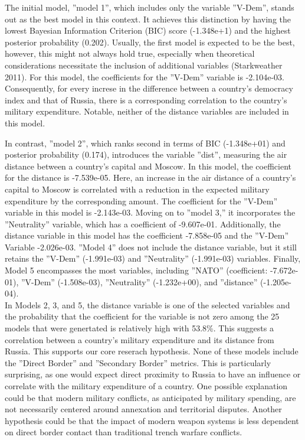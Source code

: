 \documentclass[12pt,a4paper]{article}
\begin{document}
The initial model, ''model 1'', which includes only the variable ''V-Dem'', stands out as the best model in this context. It achieves this distinction by having the lowest Bayesian Information Criterion (BIC) score (-1.348e+1) and the highest posterior probability (0.202). Usually, the first model is expected to be the best, however, this might not always hold true, especially when theoretical considerations necessitate the inclusion of additional variables (Starkweather 2011). For this model, the coefficients for the ''V-Dem'' variable is -2.104e-03. Consequently, for every increse in the difference between a country's democracy index and that of Russia, there is a corresponding correlation to the country's military expenditure. Notable, neither of the distance variables are included in this model. 

In contrast, ''model 2'', which ranks second in terms of BIC (-1.348e+01) and posterior probability (0.174), introduces the variable ''dist'', measuring the air distance between a country's capital and Moscow. In this model, the coefficient for the distance is -7.539e-05. Here, an increase in the air distance of a country's capital to Moscow is correlated with a reduction in the expected military expenditure by the corresponding amount. The coefficient for the ''V-Dem'' variable in this model is -2.143e-03. Moving on to ''model 3,'' it incorporates the ''Neutrality'' variable, which has a coefficient of -9.607e-01. Additionally, the distance variable in this model has the coefficient -7.858e-05 and the ''V-Dem'' Variable -2.026e-03. ''Model 4'' does not include the distance variable, but it still retains the ''V-Dem'' (-1.991e-03) and ''Neutrality'' (-1.991e-03) variables. Finally, Model 5 encompasses the most variables, including ''NATO'' (coefficient: -7.672e-01), ''V-Dem'' (-1.508e-03), ''Neutrality'' (-1.232e+00), and ''distance'' (-1.205e-04).\\

In Models 2, 3, and 5, the distance variable is one of the selected variables and the probability that the coefficient for the variable is not zero among the 25 models that were genertated is relatively high with 53.8\%. This suggests a correlation between a country's military expenditure and its distance from Russia. This supports our core reserach hypothesis. None of these models include the ''Direct Border'' and ''Secondary Border'' metrics. This is particularly surprising, as one would expect direct proximity to Russia to have an influence or correlate with the military expenditure of a country. One possible explanation could be that modern military conflicts, as anticipated by military spending, are not necessarily centered around annexation and territorial disputes. Another hypothesis could be that the impact of modern weapon systems is less dependent on direct border contact than traditional trench warfare conflicts.
\end{document}
